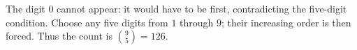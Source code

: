 The digit $0$ cannot appear: it would have to be first, contradicting the five-digit condition. Choose any five digits from $1$ through $9$; their increasing order is then forced. Thus the count is $\binom95=\boxed{126}$.
